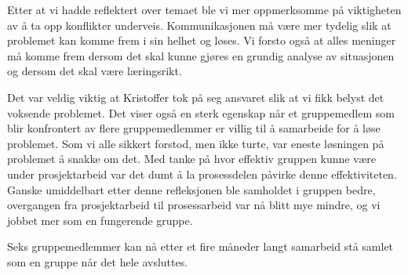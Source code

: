 Etter at vi hadde reflektert over temaet ble vi mer oppmerksomme på viktigheten av å ta opp konflikter underveis.
Kommunikasjonen må være mer tydelig slik at problemet kan komme frem i sin helhet og løses. 
Vi forsto også at alles meninger må komme frem dersom det skal kunne gjøres en grundig analyse av situasjonen
og dersom det skal være læringsrikt. 

Det var veldig viktig at Kristoffer tok på seg ansvaret slik at vi fikk belyst det voksende problemet.
Det viser også en sterk egenskap når et gruppemedlem som blir konfrontert av flere gruppemedlemmer er villig til 
å samarbeide for å løse problemet. 
Som vi alle sikkert forstod, men ikke turte, var eneste løsningen på problemet å snakke om det. 
Med tanke på hvor effektiv gruppen kunne være under prosjektarbeid var det dumt å la prosessdelen påvirke
denne effektiviteten. Ganske umiddelbart etter denne refleksjonen ble samholdet i gruppen bedre,
overgangen fra prosjektarbeid til prosessarbeid var nå blitt mye mindre, og vi jobbet mer som en fungerende gruppe.

Seks gruppemedlemmer kan nå etter et fire måneder langt samarbeid stå samlet som en gruppe når det hele avsluttes.